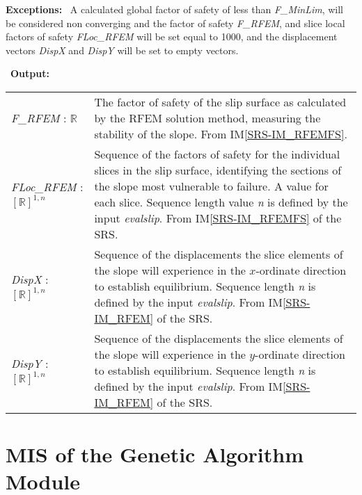 \documentclass[12pt]{article}
\begin{document}
\noindent \textbf{Exceptions:} ~\newline\noindent A
calculated global factor of safety of less than \textit{F\_MinLim}, will be
considered non converging and the factor of safety \textit{F\_RFEM},
and slice local factors of safety \textit{FLoc\_RFEM} will be set
equal to 1000, and the displacement vectors \textit{DispX} and
\textit{DispY} will be set to empty vectors.

~\newline\noindent \textbf{Output:}
\renewcommand*{\arraystretch}{1.5}
\begin{longtable}{p{} p{}}
  \textit{F\_RFEM} : $\mathbb{R}$ & The factor of safety of the slip
  surface as calculated by the RFEM solution method, measuring the
  stability of the slope. From IM\ref{SRS-IM_RFEMFS}.\\

  \textit{FLoc\_RFEM} : $[\mathbb{R}]^{1,n}$ & Sequence of the factors
  of safety for the individual slices in the slip surface, identifying
  the sections of the slope most vulnerable to failure. A value for
  each slice. Sequence length value \textit{n} is defined by the input
  \textit{evalslip}. From IM\ref{SRS-IM_RFEMFS} of the SRS.\\

  \textit{DispX} : $[\mathbb{R}]^{1,n}$ & Sequence of the
  displacements the slice elements of the slope will experience in the
  $x$-ordinate direction to establish equilibrium. Sequence length
  \textit{n} is defined by the input \textit{evalslip}. From
  IM\ref{SRS-IM_RFEM} of the SRS.\\

  \textit{DispY} : $[\mathbb{R}]^{1,n}$ & Sequence of the
  displacements the slice elements of the slope will experience in the
  $y$-ordinate direction to establish equilibrium. Sequence length
  \textit{n} is defined by the input \textit{evalslip}. From
  IM\ref{SRS-IM_RFEM} of the SRS.
\end{longtable}


\section{MIS of the Genetic Algorithm Module} \label{sec:GenAlgMod}
\end{document}
